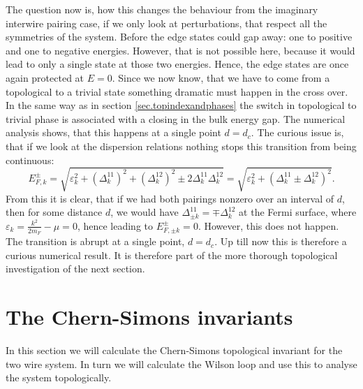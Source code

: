 The question now is, how this changes the behaviour from the imaginary interwire pairing case, if we only look at perturbations, that respect all the symmetries of the system. Before the edge states could gap away: one to positive and one to negative energies. However, that is not possible here, because it would lead to only a single state at those two energies. Hence, the edge states are once again protected at $E = 0$. Since we now know, that we have to come from a topological to a trivial state something dramatic must happen in the cross over. In the same way as in section \ref{sec.topindexandphases} the switch in topological to trivial phase is associated with a closing in the bulk energy gap. The numerical analysis shows, that this happens at a single point $d = d_c$. The curious issue is, that if we look at the dispersion relations nothing stops this transition from being continuous:
\begin{equation}
E^{\pm}_{F,k} = \sqrt{\varepsilon^2_k + (\Delta^{11}_k)^2 + (\Delta^{12}_k)^2 \pm 2\Delta^{11}_k\Delta^{12}_k} = \sqrt{\varepsilon^2_k + (\Delta^{11}_k \pm \Delta^{12}_k)^2}. \nonumber
\end{equation}
From this it is clear, that if we had both pairings nonzero over an interval of $d$, then for some distance $d$, we would have $\Delta^{11}_{\pm k} = \mp \Delta^{12}_k$ at the Fermi surface, where $\varepsilon_k = \frac{k^2}{2m_F} - \mu =  0$, hence leading to $E^{\pm}_{F,\pm k} = 0$. However, this does not happen. The transition is abrupt at a single point, $d = d_c$. Up till now this is therefore a curious numerical result. It is therefore part of the more thorough topological investigation of the next section.

\section{The Chern-Simons invariants}
\label{sec.2wires_CSinv}
In this section we will calculate the Chern-Simons topological invariant for the two wire system. In turn we will calculate the Wilson loop and use this to analyse the system topologically. 

